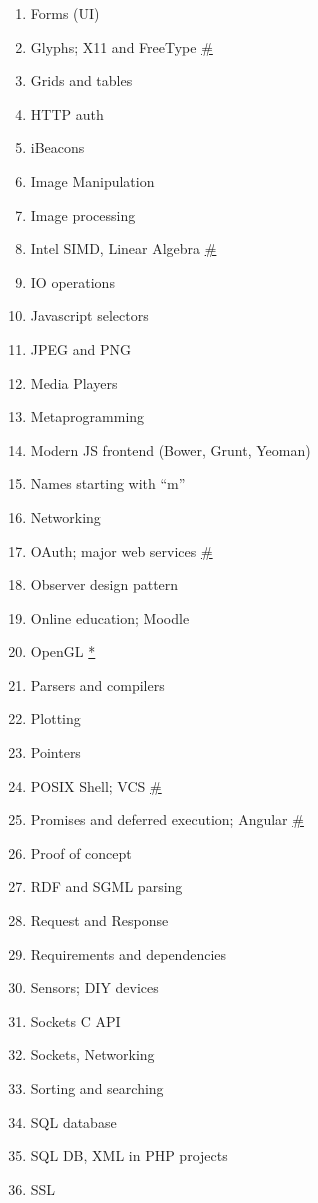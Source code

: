 \documentclass[conference,10pt]{IEEEtran}
\begin{document}
\begin{figure}[H]
\begin{multicols}{2}
\begin{enumerate}
    \item Forms (UI)
    \item Glyphs; X11 and FreeType \hyperref[dual]{\#}
    \item Grids and tables
    \item HTTP auth
    \item iBeacons
    \item Image Manipulation
    \item Image processing
    \item Intel SIMD, Linear Algebra \hyperref[dual]{\#}
    \item IO operations
    \item Javascript selectors
    \item JPEG and PNG
    \item Media Players
    \item Metaprogramming
    \item Modern JS frontend (Bower, Grunt, Yeoman)
    \item Names starting with “m”
    \item Networking
    \item OAuth; major web services \hyperref[dual]{\#}
    \item Observer design pattern
    \item Online education; Moodle
    \item OpenGL \hyperref[duplicate]{*}
    \item Parsers and compilers
    \item Plotting
    \item Pointers
    \item POSIX Shell; VCS \hyperref[dual]{\#}
    \item Promises and deferred execution; Angular \hyperref[dual]{\#}
    \item Proof of concept
    \item RDF and SGML parsing
    \item Request and Response
    \item Requirements and dependencies
    \item Sensors; DIY devices
    \item Sockets C API
    \item Sockets, Networking
    \item Sorting and searching
    \item SQL database
    \item SQL DB, XML in PHP projects
    \item SSL

\end{enumerate}
\end{multicols}
\end{figure}
\end{document}
